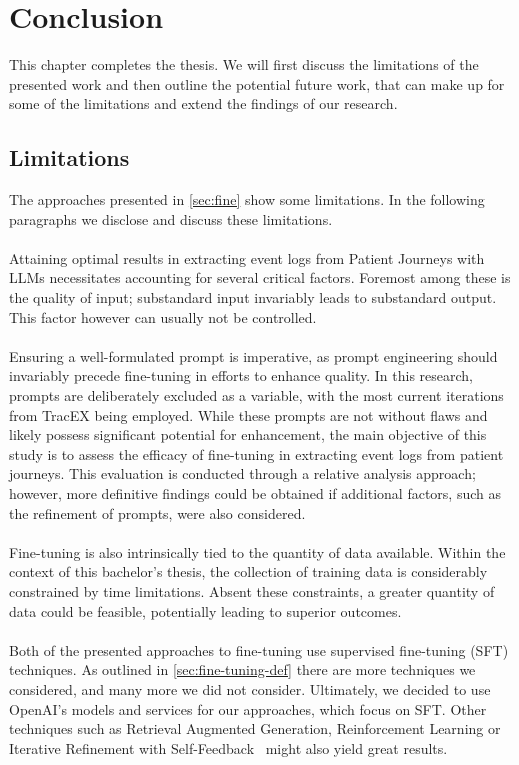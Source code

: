 \section{Conclusion}\label{sec:conclusion}
This chapter completes the thesis. We will first discuss the limitations of the presented work and then outline the potential future work, that can make up for some of the limitations and extend the findings of our research.

\subsection{Limitations}\label{sec:limitations}
The approaches presented in \autoref{sec:fine} show some limitations. In the following paragraphs we disclose and discuss these limitations.\\\\
Attaining optimal results in extracting event logs from Patient Journeys with LLMs necessitates accounting for several critical factors. Foremost among these is the quality of input; substandard input invariably leads to substandard output. This factor however can usually not be controlled.\\\\
Ensuring a well-formulated prompt is imperative, as prompt engineering should invariably precede fine-tuning in efforts to enhance quality.
In this research, prompts are deliberately excluded as a variable, with the most current iterations from TracEX being employed. While these prompts are not without flaws and likely possess significant potential for enhancement, the main objective of this study is to assess the efficacy of fine-tuning in extracting event logs from patient journeys. This evaluation is conducted through a relative analysis approach; however, more definitive findings could be obtained if additional factors, such as the refinement of prompts, were also considered.\\\\
Fine-tuning is also intrinsically tied to the quantity of data available. Within the context of this bachelor’s thesis, the collection of training data is considerably constrained by time limitations. Absent these constraints, a greater quantity of data could be feasible, potentially leading to superior outcomes.\\\\
Both of the presented approaches to fine-tuning use supervised fine-tuning (SFT) techniques. As outlined in \autoref{sec:fine-tuning-def} there are more techniques we considered, and many more we did not consider. Ultimately, we decided to use OpenAI's models and services for our approaches, which focus on SFT. Other techniques such as Retrieval Augmented Generation, Reinforcement Learning\cite{ovadia_fine-tuning_2024} or Iterative Refinement with Self-Feedback~\cite{madaan_self-refine_2023} might also yield great results.

